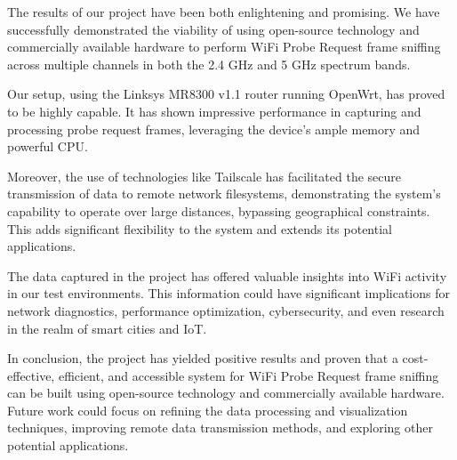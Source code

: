\documentclass{article}
\begin{document}
The results of our project have been both enlightening and promising. We have successfully demonstrated the viability of using open-source technology and commercially available hardware to perform WiFi Probe Request frame sniffing across multiple channels in both the 2.4 GHz and 5 GHz spectrum bands.

Our setup, using the Linksys MR8300 v1.1 router running OpenWrt, has proved to be highly capable. It has shown impressive performance in capturing and processing probe request frames, leveraging the device's ample memory and powerful CPU.

Moreover, the use of technologies like Tailscale has facilitated the secure transmission of data to remote network filesystems, demonstrating the system's capability to operate over large distances, bypassing geographical constraints. This adds significant flexibility to the system and extends its potential applications.

The data captured in the project has offered valuable insights into WiFi activity in our test environments. This information could have significant implications for network diagnostics, performance optimization, cybersecurity, and even research in the realm of smart cities and IoT.

In conclusion, the project has yielded positive results and proven that a cost-effective, efficient, and accessible system for WiFi Probe Request frame sniffing can be built using open-source technology and commercially available hardware. Future work could focus on refining the data processing and visualization techniques, improving remote data transmission methods, and exploring other potential applications.


\end{document}
